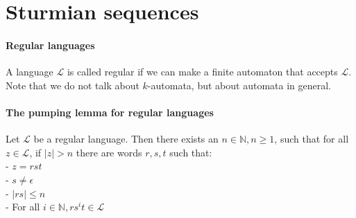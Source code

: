 \documentclass{article}
\begin{document}
\section*{Sturmian sequences}
\paragraph{Regular languages}
A language $\mathcal{L}$ is called regular if we can make a finite automaton
that accepts $\mathcal{L}$. Note that we do not talk about $k$-automata, but
about automata in general.

\paragraph{The pumping lemma for regular languages}
\begin{automata} \label{Pump}
Let $\mathcal{L}$ be a regular language. Then there 
exists an $n \in \mathbb{N}, n \ge 1$, such that for all $z \in \mathcal{L}$, 
if $|z| > n$ there are words $r, s, t$ such that:\\
- $z = rst$\\
- $s \ne \epsilon$\\
- $|rs| \le n$\\
- For all $i \in \mathbb{N}, r s^i t \in \mathcal{L}$
\end{automata}
\end{document}
